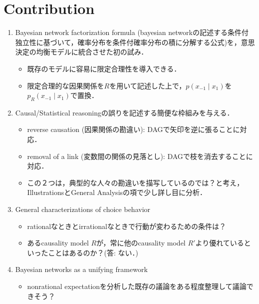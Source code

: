 \documentclass[11pt,a4paper,dvipdfmx]{article}
\theoremstyle{plain}
\begin{document}
\section{Contribution}
\begin{enumerate}
	\item Bayesian network factorization formula (bayesian networkの記述する条件付独立性に基づいて，確率分布を条件付確率分布の積に分解する公式)を，意思決定の均衡モデルに統合させた初の試み．
	\begin{itemize}
		\item 既存のモデルに容易に限定合理性を導入できる．
		\item 限定合理的な因果関係を$R$を用いて記述した上で，$p(x_{-1} \mid x_1)$を$p_R(x_{-1} \mid x_1)$で置換．
	\end{itemize}
	\item Causal/Statistical reasoningの誤りを記述する簡便な枠組みを与える．
		\begin{itemize}
			\item reverse causation (因果関係の勘違い): DAGで矢印を逆に張ることに対応．
			\item removal of a link (変数間の関係の見落とし): DAGで枝を消去することに対応．
			\item この２つは，典型的な人々の勘違いを描写しているのでは？と考え，IllustrationsとGeneral Analysisの項で少し詳し目に分析．
		\end{itemize}
	\item General characterizations of choice behavior
		\begin{itemize}
			\item rationalなときとirrationalなときで行動が変わるための条件は？
			\item あるcausality model $R$が，常に他のcausality model $R'$より優れているといったことはあるのか？(答: ない．)
		\end{itemize}
	\item Bayesian networks as a unifying framework
		\begin{itemize}
			\item nonrational expectationを分析した既存の議論をある程度整理して議論できそう？
		\end{itemize}
\end{enumerate}


\newpage
\end{document}
